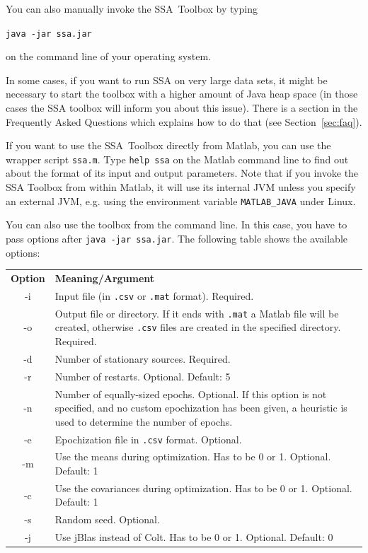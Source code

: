 \documentclass{article}
\newcommand{\1}{\ensuremath{\mathds{1}}}
\newcommand{\0}{\ensuremath{0}}
\begin{document}
You can also manually invoke the SSA~Toolbox by typing
\begin{center}
  \texttt{java -jar ssa.jar}
\end{center}
on the command line of your operating system.

In some cases, if you want to run SSA on very large data sets, it might be necessary to start the toolbox
with a higher amount of Java heap space (in those cases the SSA toolbox will inform you
about this issue). There is a section in the Frequently Asked Questions which explains how to do that
(see Section~\ref{sec:faq}).

If you want to use the SSA~Toolbox directly 
from Matlab, you can use the wrapper script \texttt{ssa.m}. Type \texttt{help ssa} on 
the Matlab command line to find out about the format of its input and output parameters. 
Note that if you invoke the SSA Toolbox from within Matlab, it will use its
internal JVM unless you specify an external JVM, e.g. using the environment
variable \texttt{MATLAB\_JAVA} under Linux.

You can also use the toolbox from the command line.
In this case, you have to pass options after \texttt{java -jar ssa.jar}. The following table
shows the available options:\\


\begin{tabular}{cp{10cm}}
 \textbf{Option} & \textbf{Meaning/Argument}\\
 -i & Input file (in \texttt{.csv} or \texttt{.mat} format). Required.\\
 -o & Output file or directory. If it ends with \texttt{.mat} a Matlab file will be created,
      otherwise \texttt{.csv} files are created in the specified directory. Required.\\
 -d & Number of stationary sources. Required.\\
 -r & Number of restarts. Optional. Default: 5\\
 -n & Number of equally-sized epochs. Optional. If this option is not specified, and no custom
      epochization has been given, a heuristic is used to determine the number of epochs.\\
 -e & Epochization file in \texttt{.csv} format. Optional.\\
 -m & Use the means during optimization. Has to be 0 or 1. Optional. Default: 1\\
 -c & Use the covariances during optimization. Has to be 0 or 1. Optional. Default: 1\\
 -s & Random seed. Optional.\\
 -j & Use jBlas instead of Colt. Has to be 0 or 1. Optional. Default: 0\\
\end{tabular}
\\
\end{document}
